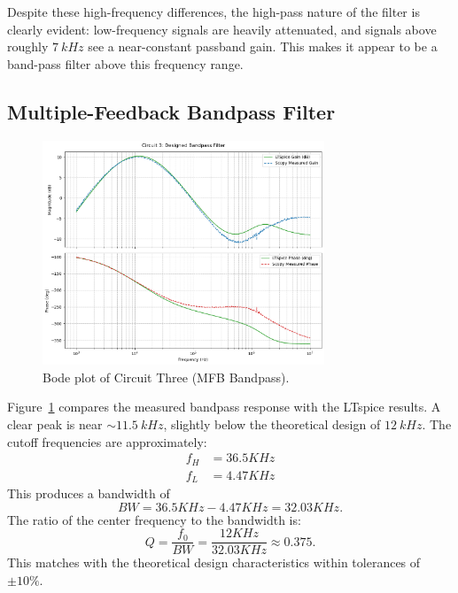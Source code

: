 \documentclass[12pt]{article}
\begin{document}
Despite these high-frequency differences, the high-pass nature of the filter is
clearly evident: low-frequency signals are heavily attenuated, and signals above
roughly $\SI{7}{kHz}$ see a near-constant passband gain. This makes it appear to
be a band-pass filter above this frequency range.

\subsection{Multiple-Feedback Bandpass Filter}

\begin{figure}[H]
	\centering
	\includegraphics[width=0.75\textwidth]{07_bode3}
	\caption{Bode plot of Circuit Three (MFB Bandpass).}
	\label{fig:bode3}
\end{figure}

Figure~\ref{fig:bode3} compares the measured bandpass response with the LTspice
results. A clear peak is near $\sim\SI{11.5}{kHz}$, slightly below
the theoretical design of $\SI{12}{kHz}$.
The cutoff frequencies are approximately:
\begin{align*}
	f_H & = 36.5KHz \\
	f_L & = 4.47KHz
\end{align*}
This produces a bandwidth of
\[
	BW = 36.5KHz - 4.47KHz = 32.03KHz.
\]
The ratio of the center frequency to the bandwidth is:
\[
	Q = \frac{f_0}{BW} = \frac{12KHz}{32.03KHz} \approx 0.375.
\]
This matches with the theoretical design characteristics within tolerances of $\pm{10\%}$.
\end{document}

